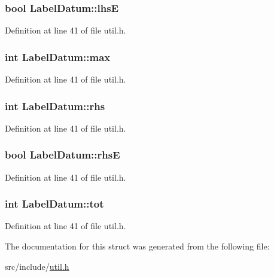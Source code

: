 \subsubsection[{lhsE}]{\setlength{\rightskip}{0pt plus 5cm}bool Label\+Datum\+::lhsE}\hypertarget{struct_label_datum_a090f9cb87d5c86357e8541cfa5734987}{}\label{struct_label_datum_a090f9cb87d5c86357e8541cfa5734987}


Definition at line 41 of file util.\+h.

\subsubsection[{max}]{\setlength{\rightskip}{0pt plus 5cm}int Label\+Datum\+::max}\hypertarget{struct_label_datum_ad12ade588686bd305fd6db8fb2bf65b3}{}\label{struct_label_datum_ad12ade588686bd305fd6db8fb2bf65b3}


Definition at line 41 of file util.\+h.

\subsubsection[{rhs}]{\setlength{\rightskip}{0pt plus 5cm}int Label\+Datum\+::rhs}\hypertarget{struct_label_datum_a78490546433503593378e5a51d25357d}{}\label{struct_label_datum_a78490546433503593378e5a51d25357d}


Definition at line 41 of file util.\+h.

\subsubsection[{rhsE}]{\setlength{\rightskip}{0pt plus 5cm}bool Label\+Datum\+::rhsE}\hypertarget{struct_label_datum_a3c8e06212069ae651190dbacaf51c293}{}\label{struct_label_datum_a3c8e06212069ae651190dbacaf51c293}


Definition at line 41 of file util.\+h.

\subsubsection[{tot}]{\setlength{\rightskip}{0pt plus 5cm}int Label\+Datum\+::tot}\hypertarget{struct_label_datum_a2a1456e3ecb8e615959b17d9592e4fdd}{}\label{struct_label_datum_a2a1456e3ecb8e615959b17d9592e4fdd}


Definition at line 41 of file util.\+h.



The documentation for this struct was generated from the following file\+:\begin{DoxyCompactItemize}
\item 
src/include/\hyperlink{util_8h}{util.\+h}\end{DoxyCompactItemize}
